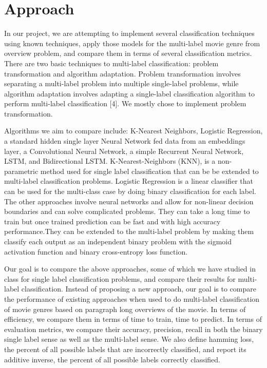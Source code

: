 \documentclass[sigconf]{acmart}
\begin{document}
\section{Approach}
In our project, we are attempting to implement several classification techniques using known techniques, apply those models for the multi-label movie genre from overview problem, and compare them in terms of several classification metrics. There are two basic techniques to multi-label classification: problem transformation and algorithm adaptation. Problem transformation involves separating a multi-label problem into multiple single-label problems, while algorithm adaptation involves adapting a single-label classification algorithm to perform multi-label classification [4]. We mostly chose to implement problem transformation.

Algorithms we aim to compare include: K-Nearest Neighbors, Logistic Regression, a standard hidden single layer Neural Network fed data from an embeddings layer, a Convolutional Neural Network, a simple Recurrent Neural Network, LSTM, and Bidirectional LSTM. K-Nearest-Neighbors (KNN), is a non-parametric method used for single label classification that can be be extended to multi-label classification problems. Logistic Regression is a linear classifier that can be used for the multi-class case by doing binary classification for each label. The other approaches involve neural networks and allow for non-linear decision boundaries and can solve complicated problems. They can take a long time to train but once trained prediction can be fast and with high accuracy performance.They can be extended to the multi-label problem by making them classify each output as an independent binary problem with the sigmoid activation function and binary cross-entropy loss function.  

Our goal is to compare the above approaches, some of which we have studied in class for single label classification problems, and compare their results for multi-label classification. Instead of proposing a new approach, our goal is to compare the performance of existing approaches when used to do multi-label classification of movie genres based on paragraph long overviews of the movie. In terms of efficiency, we compare them in terms of time to train, time to predict. In terms of evaluation metrics, we compare their accuracy, precision, recall in both the binary single label sense as well as the multi-label sense. We also define hamming loss, the percent of all possible labels that are incorrectly classified, and report its additive inverse, the percent of all possible labels correctly classified. 
\end{document}
